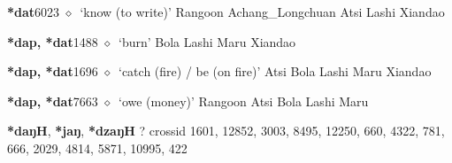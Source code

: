   \begin{list}{}{\leftmargin=1.5em \itemindent=-1.5em}
  \item {\footnotesize \textbf{*dat}}{\tiny 6023}
         $\diamond$~`know (to write)'
         Rangoon 
\hspace{1ex}
         Achang\_Longchuan 
\hspace{1ex}
         Atsi 
\hspace{1ex}
         Lashi 
\hspace{1ex}
         Xiandao 
  \item {\footnotesize \textbf{*dap, *dat}}{\tiny 1488}
\hspace{1ex}
         $\diamond$~`burn'
         Bola 
\hspace{1ex}
         Lashi 
\hspace{1ex}
         Maru 
\hspace{1ex}
         Xiandao 
  \item {\footnotesize \textbf{*dap, *dat}}{\tiny 1696}
\hspace{1ex}
         $\diamond$~`catch (fire) / be (on fire)'
         Atsi 
\hspace{1ex}
         Bola 
\hspace{1ex}
         Lashi 
\hspace{1ex}
         Maru 
\hspace{1ex}
         Xiandao 
  \item {\footnotesize \textbf{*dap, *dat}}{\tiny 7663}
\hspace{1ex}
         $\diamond$~`owe (money)'
         Rangoon 
\hspace{1ex}
         Atsi 
\hspace{1ex}
         Bola 
\hspace{1ex}
         Lashi 
\hspace{1ex}
         Maru 
  \end{list}
\item
\textbf{*daŋH}, \textbf{*jaŋ}, \textbf{*dzaŋH}
?
  {\tiny crossid 1601, 12852, 3003, 8495, 12250, 660, 4322, 781, 666, 2029, 4814, 5871, 10995, 422}
